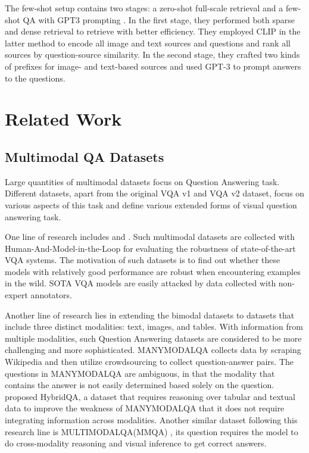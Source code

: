 \documentclass[nohyperref]{article}
\theoremstyle{plain}
\theoremstyle{definition}
\theoremstyle{remark}
\begin{document}
    The few-shot setup contains two stages: a zero-shot full-scale retrieval and a few-shot QA with GPT3 prompting \cite{PICa}. In the first stage, they performed both sparse \cite{bm25} and dense retrieval \cite{clip} to retrieve with better efficiency. They employed CLIP in the latter method to encode all image and text sources and questions and rank all sources by question-source similarity. In the second stage, they crafted two kinds of prefixes for image- and text-based sources and used GPT-3 to prompt answers to the questions.


    \section{Related Work}

    \subsection{Multimodal QA Datasets}
    Large quantities of multimodal datasets focus on Question Answering task. Different datasets, apart from the original VQA v1 \citep{antol2015vqa} and VQA v2 \citep{DBLP:journals/corr/GoyalKSBP16} dataset, focus on various aspects of this task and define various extended forms of visual question answering task. \par

    One line of research includes \citet{https://doi.org/10.48550/arxiv.2106.00245} and \citet{https://doi.org/10.48550/arxiv.2106.02280}. Such multimodal datasets are collected with Human-And-Model-in-the-Loop for evaluating the robustness of state-of-the-art VQA systems. The motivation of such datasets is to find out whether these models with relatively good performance are robust when encountering examples in the wild. SOTA VQA models are easily attacked by data collected with non-expert annotators.\par

    Another line of research lies in extending the bimodal datasets to datasets that include three distinct modalities: text, images, and tables. With information from multiple modalities, such Question Answering datasets are considered to be more challenging and more sophisticated. MANYMODALQA \citep{DBLP:journals/corr/abs-2001-08034} collects data by scraping Wikipedia and
    then utilize crowdsourcing to collect question-answer pairs. The questions in MANYMODALQA are ambiguous, in that the modality that contains the answer is not easily determined based solely on the question. \citet{chen-etal-2020-hybridqa} proposed HybridQA, a dataset that requires reasoning over tabular and textual data to improve the weakness of MANYMODALQA that it does not require integrating information across modalities. Another similar dataset following this research line is MULTIMODALQA(MMQA) \citep{DBLP:journals/corr/abs-2104-06039}, its question requires the model to do cross-modality reasoning and visual inference to get correct answers.\par
\end{document}
